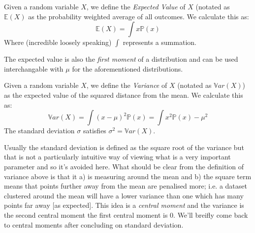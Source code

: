 \documentclass[../../Axiomathic.tex]{subfiles}
\begin{document}
\begin{defn}
Given a random variable $X$, we define the \textit{Expected Value} of $X$ (notated as $\mathbb{E}(X)$ as the probability weighted average of all outcomes. We calculate this as:
\[\mathbb{E}(X) = \int x \mathbb{P}(x)\]
Where (incredible loosely speaking) $\int$ represents a summation.
\end{defn}
The expected value is also the \textit{first moment} of a distribution and can be used interchangable with $\mu$ for the aforementioned distributions. 
\begin{defn}
Given a random variable $X$, we define the \textit{Variance} of $X$ (notated as $\mathbb{V}ar(X)$) as the expected value of the squared distance from the mean. We calculate this as:
\[\mathbb{V}ar(X)= \int (x-\mu)^2\mathbb{P}(x)= \int x^2\mathbb{P}(x)-\mu^2\]
The standard deviation $\sigma$ satisfies $\sigma^2=\mathbb{V}ar(X)$.
\end{defn}
\begin{remark}
Usually the standard deviation is defined as the square root of the variance but that is not a particularly intuitive way of viewing what is a very important parameter and so it's avoided here. What should be clear from the definition of variance above is that it a) is measuring around the mean and b) the square term means that points further away from the mean are penalised more; i.e. a dataset clustered around the mean will have a lower variance than one which has many points far away [as expected]. This idea is a \textit{central moment} and the variance is the second central moment {the first central moment is 0}. We'll breifly come back to central moments after concluding on standard deviation.
\end{remark}
\end{document}
